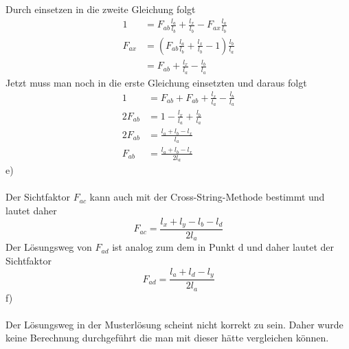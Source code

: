 Durch einsetzen in die zweite Gleichung folgt
\begin{align*}
	1 &= F_{ab}\frac{l_a}{l_b} + \frac{l_x}{l_b} - F_{ax}\frac{l_a}{l_b} \\
	F_{ax} &= \left(F_{ab}\frac{l_a}{l_b} + \frac{l_x}{l_b} - 1\right) \frac{l_b}{l_a} \\
	&= F_{ab} + \frac{l_x}{l_a} - \frac{l_b}{l_a}
\end{align*} 
Jetzt muss man noch in die erste Gleichung einsetzten und daraus folgt
\begin{align*}
	1 &= F_{ab} + F_{ab} + \frac{l_x}{l_a} - \frac{l_b}{l_a} \\
	2F_{ab} &= 1 - \frac{l_x}{l_a} + \frac{l_b}{l_a} \\
	2F_{ab} &= \frac{l_a + l_b - l_x}{l_a} \\
	F_{ab} &= \frac{l_a + l_b - l_x}{2l_a}
\end{align*}
e) \\ \\
Der Sichtfaktor $F_{ac}$ kann auch mit der Cross-String-Methode bestimmt und lautet daher
\[
	F_{ac} = \frac{l_x + l_y - l_b - l_d}{2l_a}
\]
Der Lösungsweg von $F_{ad}$ ist analog zum dem in Punkt d und daher lautet der Sichtfaktor
\[
	F_{ad} = \frac{l_a + l_d - l_y}{2l_a}
\]
f) \\ \\
Der Lösungsweg in der Musterlösung scheint nicht korrekt zu sein. Daher wurde keine Berechnung durchgeführt die man mit dieser hätte vergleichen können.
